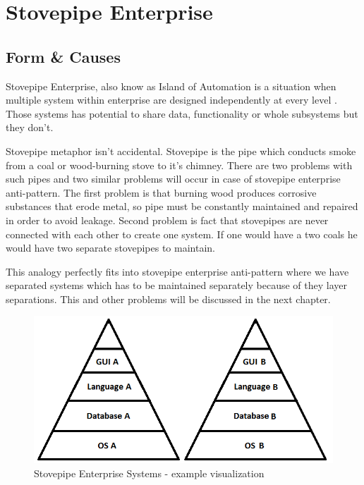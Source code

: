 \section{Stovepipe Enterprise}

\subsection{Form \& Causes}

Stovepipe Enterprise, also know as Island of Automation \cite{c2com} is a situation when multiple system within enterprise are designed independently at every level \cite{SurvivalGuide}. Those systems has potential to share data, functionality or whole subsystems but they don't.

Stovepipe metaphor isn't accidental. Stovepipe is the pipe which conducts smoke from a coal or wood-burning stove to it's chimney. There are two problems with such pipes and two similar problems will occur in case of stovepipe enterprise anti-pattern. The first problem is that burning wood produces corrosive substances that erode metal, so pipe must be constantly maintained and repaired in order to avoid leakage. Second problem is fact that stovepipes are never connected with each other to create one system. If one would have a two coals he would have two separate stovepipes to maintain.

This analogy perfectly fits into stovepipe enterprise anti-pattern where we have separated systems which has to be maintained separately because of they layer separations. This and other problems will be discussed in the next chapter.

\begin{figure}[!h]
    \centering
    \includegraphics[scale=0.7]{Images/Systems.png}
    \caption[Stovepipe Enterprise Systems]{Stovepipe Enterprise Systems - example visualization}
    \label{fig:Systems}
\end{figure}

